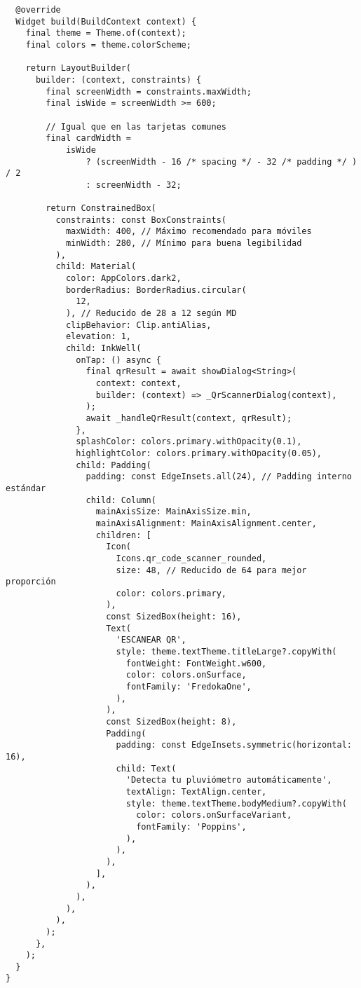 \begin{verbatim}
  @override
  Widget build(BuildContext context) {
    final theme = Theme.of(context);
    final colors = theme.colorScheme;

    return LayoutBuilder(
      builder: (context, constraints) {
        final screenWidth = constraints.maxWidth;
        final isWide = screenWidth >= 600;

        // Igual que en las tarjetas comunes
        final cardWidth =
            isWide
                ? (screenWidth - 16 /* spacing */ - 32 /* padding */ ) / 2
                : screenWidth - 32;

        return ConstrainedBox(
          constraints: const BoxConstraints(
            maxWidth: 400, // Máximo recomendado para móviles
            minWidth: 280, // Mínimo para buena legibilidad
          ),
          child: Material(
            color: AppColors.dark2,
            borderRadius: BorderRadius.circular(
              12,
            ), // Reducido de 28 a 12 según MD
            clipBehavior: Clip.antiAlias,
            elevation: 1,
            child: InkWell(
              onTap: () async {
                final qrResult = await showDialog<String>(
                  context: context,
                  builder: (context) => _QrScannerDialog(context),
                );
                await _handleQrResult(context, qrResult);
              },
              splashColor: colors.primary.withOpacity(0.1),
              highlightColor: colors.primary.withOpacity(0.05),
              child: Padding(
                padding: const EdgeInsets.all(24), // Padding interno estándar
                child: Column(
                  mainAxisSize: MainAxisSize.min,
                  mainAxisAlignment: MainAxisAlignment.center,
                  children: [
                    Icon(
                      Icons.qr_code_scanner_rounded,
                      size: 48, // Reducido de 64 para mejor proporción
                      color: colors.primary,
                    ),
                    const SizedBox(height: 16),
                    Text(
                      'ESCANEAR QR',
                      style: theme.textTheme.titleLarge?.copyWith(
                        fontWeight: FontWeight.w600,
                        color: colors.onSurface,
                        fontFamily: 'FredokaOne',
                      ),
                    ),
                    const SizedBox(height: 8),
                    Padding(
                      padding: const EdgeInsets.symmetric(horizontal: 16),
                      child: Text(
                        'Detecta tu pluviómetro automáticamente',
                        textAlign: TextAlign.center,
                        style: theme.textTheme.bodyMedium?.copyWith(
                          color: colors.onSurfaceVariant,
                          fontFamily: 'Poppins',
                        ),
                      ),
                    ),
                  ],
                ),
              ),
            ),
          ),
        );
      },
    );
  }
}


\end{verbatim}
